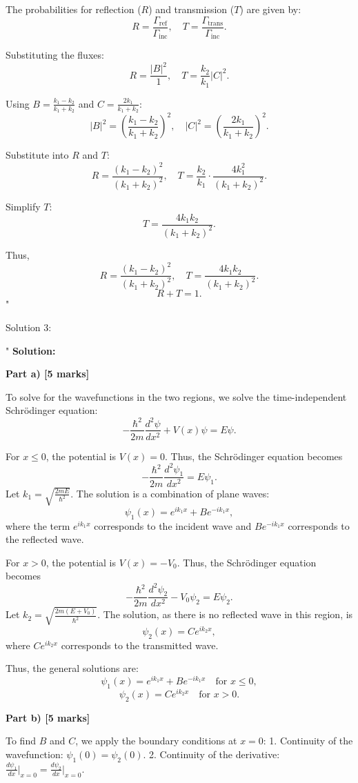 The probabilities for reflection ($R$) and transmission ($T$) are given by:  
\[
R = \frac{\Gamma_\text{ref}}{\Gamma_\text{inc}}, \quad T = \frac{\Gamma_\text{trans}}{\Gamma_\text{inc}}.
\]  

Substituting the fluxes:  
\[
R = \frac{|B|^2}{1}, \quad T = \frac{k_2}{k_1} |C|^2.
\]  

Using $B = \frac{k_1 - k_2}{k_1 + k_2}$ and $C = \frac{2k_1}{k_1 + k_2}$:  
\[
|B|^2 = \left(\frac{k_1 - k_2}{k_1 + k_2}\right)^2, \quad |C|^2 = \left(\frac{2k_1}{k_1 + k_2}\right)^2.
\]  

Substitute into $R$ and $T$:  
\[
R = \frac{(k_1 - k_2)^2}{(k_1 + k_2)^2}, \quad T = \frac{k_2}{k_1} \cdot \frac{4k_1^2}{(k_1 + k_2)^2}.
\]  

Simplify $T$:  
\[
T = \frac{4k_1k_2}{(k_1 + k_2)^2}.
\]  

Thus,  
\[
R = \frac{(k_1 - k_2)^2}{(k_1 + k_2)^2}, \quad T = \frac{4k_1k_2}{(k_1 + k_2)^2}.
\]  
\[
\boxed{R + T = 1}.
\]  "

Solution 3:

"
\textbf{Solution:}

\textbf{Part a) [5 marks]} 

To solve for the wavefunctions in the two regions, we solve the time-independent Schrödinger equation:
\[
-\frac{\hbar^2}{2m} \frac{d^2 \psi}{dx^2} + V(x)\psi = E\psi.
\]

For $x \leq 0$, the potential is $V(x) = 0$. Thus, the Schrödinger equation becomes
\[
-\frac{\hbar^2}{2m} \frac{d^2 \psi_1}{dx^2} = E \psi_1.
\]
Let $k_1 = \sqrt{\frac{2mE}{\hbar^2}}$. The solution is a combination of plane waves:
\[
\psi_1(x) = e^{ik_1x} + B e^{-ik_1x},
\]
where the term $e^{ik_1x}$ corresponds to the incident wave and $Be^{-ik_1x}$ corresponds to the reflected wave.

For $x > 0$, the potential is $V(x) = -V_0$. Thus, the Schrödinger equation becomes
\[
-\frac{\hbar^2}{2m} \frac{d^2 \psi_2}{dx^2} - V_0 \psi_2 = E \psi_2.
\]
Let $k_2 = \sqrt{\frac{2m(E+V_0)}{\hbar^2}}$. The solution, as there is no reflected wave in this region, is
\[
\psi_2(x) = C e^{ik_2x},
\]
where $Ce^{ik_2x}$ corresponds to the transmitted wave.

Thus, the general solutions are:
\[
\psi_1(x) = e^{ik_1x} + Be^{-ik_1x} \quad \text{for } x \leq 0,
\]
\[
\psi_2(x) = Ce^{ik_2x} \quad \text{for } x > 0.
\]

\textbf{Part b) [5 marks]} 

To find $B$ and $C$, we apply the boundary conditions at $x = 0$:
1. Continuity of the wavefunction: $\psi_1(0) = \psi_2(0)$.
2. Continuity of the derivative: $\frac{d\psi_1}{dx}\big|_{x=0} = \frac{d\psi_2}{dx}\big|_{x=0}$.

